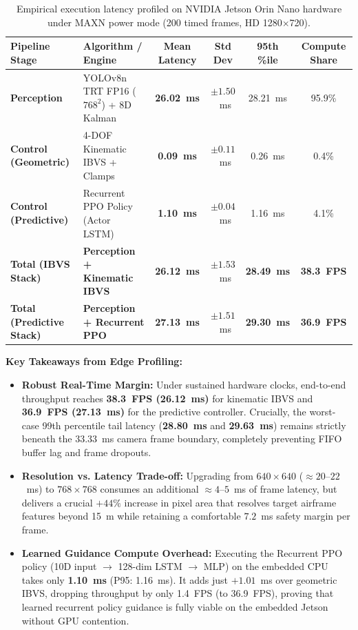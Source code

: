 \documentclass[11pt,a4paper]{article}
\begin{document}
\begin{table}[h!]
\centering
\small
\begin{tabularx}{\textwidth}{lXcccc}
\toprule
\textbf{Pipeline Stage} & \textbf{Algorithm / Engine} & \textbf{Mean Latency} & \textbf{Std Dev} & \textbf{95th \%ile} & \textbf{Compute Share} \\
\midrule
\textbf{Perception} & YOLOv8n TRT FP16 ($768^2$) + 8D Kalman & \textbf{26.02~ms} & $\pm 1.50$~ms & 28.21~ms & 95.9\% \\
\textbf{Control (Geometric)} & 4-DOF Kinematic IBVS + Clamps & \textbf{0.09~ms} & $\pm 0.11$~ms & 0.26~ms & 0.4\% \\
\textbf{Control (Predictive)} & Recurrent PPO Policy (Actor LSTM) & \textbf{1.10~ms} & $\pm 0.04$~ms & 1.16~ms & 4.1\% \\
\midrule
\textbf{Total (IBVS Stack)} & \textbf{Perception + Kinematic IBVS} & \textbf{26.12~ms} & $\pm 1.53$~ms & \textbf{28.49~ms} & \textbf{38.3~FPS} \\
\textbf{Total (Predictive Stack)} & \textbf{Perception + Recurrent PPO} & \textbf{27.13~ms} & $\pm 1.51$~ms & \textbf{29.30~ms} & \textbf{36.9~FPS} \\
\bottomrule
\end{tabularx}
\caption{Empirical execution latency profiled on NVIDIA Jetson Orin Nano hardware under MAXN power mode (200 timed frames, HD 1280$\times$720).}
\label{tab:jetson_latency}
\end{table}

\noindent
\textbf{Key Takeaways from Edge Profiling:}
\begin{itemize}[leftmargin=1.5em, itemsep=0.2em]
    \item \textbf{Robust Real-Time Margin:} Under sustained hardware clocks, end-to-end throughput reaches \textbf{38.3~FPS (26.12~ms)} for kinematic IBVS and \textbf{36.9~FPS (27.13~ms)} for the predictive controller. Crucially, the worst-case 99th percentile tail latency (\textbf{28.80~ms} and \textbf{29.63~ms}) remains strictly beneath the $33.33$~ms camera frame boundary, completely preventing FIFO buffer lag and frame dropouts.
    \item \textbf{Resolution vs. Latency Trade-off:} Upgrading from $640\times 640$ ($\approx 20\text{--}22$~ms) to $768\times 768$ consumes an additional $\approx 4\text{--}5$~ms of frame latency, but delivers a crucial $+44\%$ increase in pixel area that resolves target airframe features beyond 15~m while retaining a comfortable $7.2$~ms safety margin per frame.
    \item \textbf{Learned Guidance Compute Overhead:} Executing the Recurrent PPO policy (10D input $\to$ 128-dim LSTM $\to$ MLP) on the embedded CPU takes only \textbf{1.10~ms} (P95: 1.16~ms). It adds just $+1.01$~ms over geometric IBVS, dropping throughput by only 1.4~FPS (to 36.9~FPS), proving that learned recurrent policy guidance is fully viable on the embedded Jetson without GPU contention.
\end{itemize}
\end{document}
